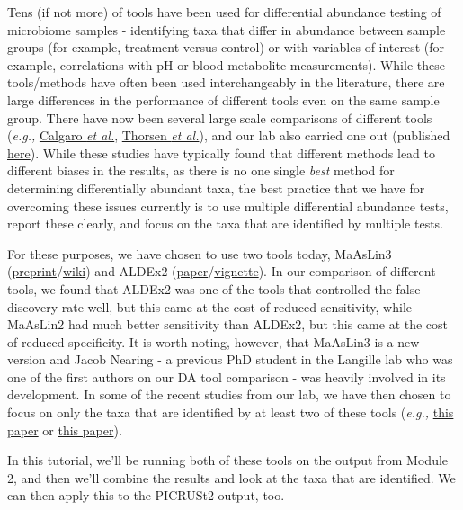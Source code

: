\documentclass[
]{book}
\begin{document}
Tens (if not more) of tools have been used for differential abundance testing of microbiome samples - identifying taxa that differ in abundance between sample groups (for example, treatment versus control) or with variables of interest (for example, correlations with pH or blood metabolite measurements). While these tools/methods have often been used interchangeably in the literature, there are large differences in the performance of different tools even on the same sample group. There have now been several large scale comparisons of different tools (\emph{e.g.,} \href{https://link.springer.com/article/10.1186/s13059-020-02104-1}{Calgaro \emph{et al.}}, \href{https://link.springer.com/article/10.1186/s40168-016-0208-8}{Thorsen \emph{et al.}}), and our lab also carried one out (published \href{https://www.nature.com/articles/s41467-022-28034-z}{here}). While these studies have typically found that different methods lead to different biases in the results, as there is no one single \emph{best} method for determining differentially abundant taxa, the best practice that we have for overcoming these issues currently is to use multiple differential abundance tests, report these clearly, and focus on the taxa that are identified by multiple tests.

For these purposes, we have chosen to use two tools today, MaAsLin3 (\href{https://pubmed.ncbi.nlm.nih.gov/39713460/}{preprint}/\href{https://github.com/biobakery/biobakery/wiki/MaAsLin3}{wiki}) and ALDEx2 (\href{https://pmc.ncbi.nlm.nih.gov/articles/PMC4030730/}{paper}/\href{https://rdrr.io/bioc/ALDEx2/f/vignettes/ALDEx2_vignette.Rmd}{vignette}). In our comparison of different tools, we found that ALDEx2 was one of the tools that controlled the false discovery rate well, but this came at the cost of reduced sensitivity, while MaAsLin2 had much better sensitivity than ALDEx2, but this came at the cost of reduced specificity. It is worth noting, however, that MaAsLin3 is a new version and Jacob Nearing - a previous PhD student in the Langille lab who was one of the first authors on our DA tool comparison - was heavily involved in its development. In some of the recent studies from our lab, we have then chosen to focus on only the taxa that are identified by at least two of these tools (\emph{e.g.,} \href{https://microbiomejournal.biomedcentral.com/articles/10.1186/s40168-023-01662-3}{this paper} or \href{https://www.nature.com/articles/s41598-024-60409-8}{this paper}).

In this tutorial, we'll be running both of these tools on the output from Module 2, and then we'll combine the results and look at the taxa that are identified. We can then apply this to the PICRUSt2 output, too.
\end{document}
